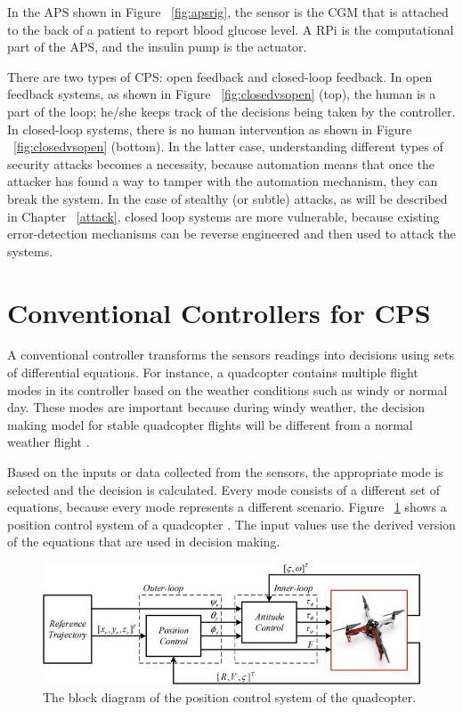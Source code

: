 In the \ac{APS} shown in Figure ~\ref{fig:apsrig}, the sensor is the \ac{CGM} that is attached to the back of a patient to report blood glucose level.  
A \ac{RPi} is the computational part of the \ac{APS}, and the insulin pump is the actuator. 

There are two types of CPS: open feedback and closed-loop feedback.
In open feedback systems, 
as shown in Figure ~\ref{fig:closedvsopen} (top), the human is a part of the loop; he/she keeps track of the decisions being taken by the controller. 
In closed-loop systems, there is no human intervention 
as shown in Figure ~\ref{fig:closedvsopen} (bottom). 
In the latter case, understanding different types of security attacks becomes a necessity, because automation means that once the attacker has found a way to tamper with the automation mechanism, they can break the system. 
In the case of stealthy (or subtle) attacks, as will be described in Chapter ~\ref{attack}, 
closed loop systems are more vulnerable, because existing error-detection mechanisms can be reverse engineered and then used to attack the systems. 

\section{Conventional Controllers for CPS}

A conventional controller transforms  the sensors readings into decisions using sets of differential equations. 
For instance, a quadcopter contains multiple flight modes in its controller based on the weather conditions such as windy or normal day. 
These modes are important because during windy weather, the decision making model for stable quadcopter flights will be different from a normal weather flight \cite{inbook}. 

Based on the inputs or data collected from the sensors, the appropriate  mode is selected and the decision is calculated. 
Every mode consists of a different set of equations, because every mode represents a different scenario.
Figure ~\ref{fig:controltheory} shows a position control system of a quadcopter \cite{inbook}. The input values use the derived version of the equations that are used in decision making. 

\begin{figure}
	\centering
	\includegraphics[width=0.7\linewidth]{Images/controltheory}
	\caption{The block diagram of the position control system of the quadcopter.
	}
	\label{fig:controltheory} 
\end{figure}


